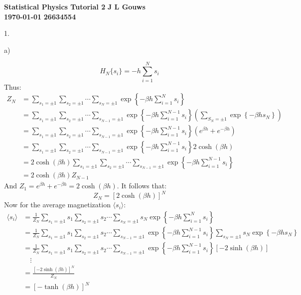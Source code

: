 \documentclass[a4paper,12pt]{article}
\newcommand\block[1]{\hspace*{#1}}
\begin{document}
\selectfont
{\Large \textbf{Statistical Physics Tutorial 2}} \hfill {\Large \textbf{J L Gouws}}\\
\block{1.0cm} {\large \textbf{\today}} \hfill {\large \textbf{26634554}}\\
\thispagestyle{empty}

1.
\begin{minipage}[t]{0.9\textwidth}
  a)
  \begin{minipage}[t]{0.9\textwidth}
    \begin{equation*}
      H_N\{s_i\} = -h\sum_{i = 1}^N s_i
    \end{equation*}
    Thus:
    \begin{align*}
      Z_N &= \sum_{s_1 = \pm 1}\sum_{s_2 = \pm 1}\cdots \sum_{s_N = \pm 1}\exp\left\{-\beta h \sum_{i = 1}^N s_i \right\}\\
          &= \sum_{s_1 = \pm 1}\sum_{s_2 = \pm 1}\cdots \sum_{s_{N-1} = \pm 1}\exp\left\{-\beta h \sum_{i = 1}^{N - 1} s_i \right\} \left(\sum_{S_N = \pm 1}\exp\left\{-\beta h s_N\right\}\right)\\
          &= \sum_{s_1 = \pm 1}\sum_{s_2 = \pm 1}\cdots \sum_{s_{N-1} = \pm 1}\exp\left\{-\beta h \sum_{i = 1}^{N - 1} s_i \right\} \left(e^{\beta h} + e^{-\beta h}\right)\\
          &= \sum_{s_1 = \pm 1}\sum_{s_2 = \pm 1}\cdots \sum_{s_{N-1} = \pm 1}\exp\left\{-\beta h \sum_{i = 1}^{N - 1} s_i \right\} 2 \cosh(\beta h)\\
          &= 2 \cosh(\beta h)\sum_{s_1 = \pm 1}\sum_{s_2 = \pm 1}\cdots \sum_{s_{N-1} = \pm 1}\exp\left\{-\beta h \sum_{i = 1}^{N - 1} s_i \right\} \\
          &= 2 \cosh(\beta h)Z_{N-1}
    \end{align*}
    And $Z_1 = e^{\beta h} + e^{-\beta h} = 2 \cosh(\beta h)$. It follows that:
    \begin{equation*}
      Z_N = [2 \cosh(\beta h)]^N
    \end{equation*}
    Now for the average magnetization $\langle s_i \rangle$:
    \begin{align*}
      \langle s_i \rangle &= \frac{1}{Z_N}\sum_{s_1 = \pm 1}s_1\sum_{s_2 = \pm 1}s_2\cdots \sum_{s_N = \pm 1} s_N\exp\left\{-\beta h \sum_{i = 1}^N s_i \right\}\\
                          &= \frac{1}{Z_N}\sum_{s_1 = \pm 1}s_1\sum_{s_2 = \pm 1}s_2\cdots \sum_{s_{N-1} = \pm 1} \exp\left\{-\beta h \sum_{i = 1}^{N-1} s_i \right\}\sum_{s_N = \pm 1} s_N\exp\left\{-\beta h  s_N \right\}\\
                          &= \frac{1}{Z_N}\sum_{s_1 = \pm 1}s_1\sum_{s_2 = \pm 1}s_2\cdots \sum_{s_{N-1} = \pm 1} \exp\left\{-\beta h \sum_{i = 1}^{N-1} s_i \right\}\left[-2 \sinh (\beta h)\right]\\
                          &\quad \vdots\\
                          &= \frac{\left[-2 \sinh (\beta h)\right]^N}{Z_N} \\
                          &= \left[- \tanh (\beta h)\right]^N 
    \end{align*}
  \end{minipage}
\end{minipage}
\end{document}
